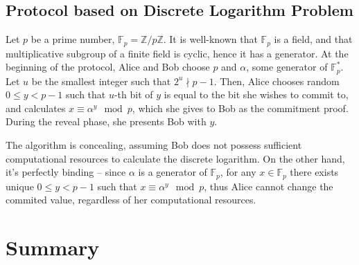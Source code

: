 \documentclass[10pt]{article}
\begin{document}
\subsection*{Protocol based on Discrete Logarithm Problem}

Let \(p\) be a prime number, \(\mathbb{F}_p=\mathbb{Z}/p\mathbb{Z}\). It is well-known that 
\(\mathbb{F}_p\) is a field, and that multiplicative subgroup of a finite field is cyclic, hence it
has a generator. At the beginning of the protocol, Alice and Bob choose \(p\) and \(\alpha\), some
generator of \(\mathbb{F}^*_p\). Let \(u\) be the smallest integer such that \(2^u \nmid p-1\). 
Then, Alice chooses random \(0\leq y < p-1\) such that \(u\)-th bit of \(y\) is equal to the bit
she wishes to commit to\footnotemark, and calculates \(x\equiv \alpha^y \mod p\), which she gives
to Bob as the commitment proof. During the reveal phase, she presents Bob with \(y\).

The algorithm is concealing, assuming Bob does not possess sufficient computational resources to
calculate the discrete logarithm. On the other hand, it's perfectly binding -- since \(\alpha\) is
a generator of \(\mathbb{F}_p\), for any \(x\in\mathbb{F}_p\) there exists unique \(0\leq y < p-1\)
such that \(x\equiv \alpha^y \mod p\), thus Alice cannot change the commited value, regardless
of her computational resources.


\section{Summary}

\nocite{*}



\end{document}
